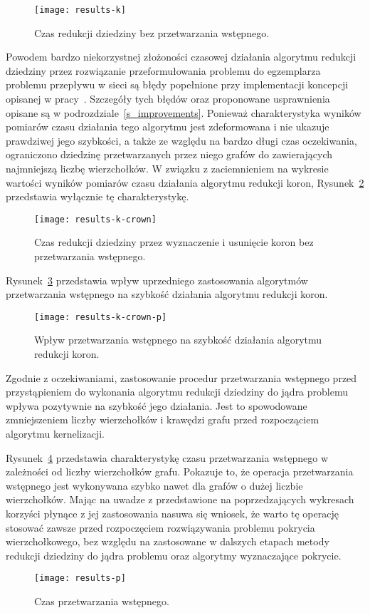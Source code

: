   \begin{figure}
    \caption{Czas redukcji dziedziny bez przetwarzania wstępnego.}
    \label{fig_results_k}
    \centering
      \texttt{[image: results-k]}
  \end{figure}

  Powodem bardzo niekorzystnej złożoności czasowej działania algorytmu redukcji dziedziny przez rozwiązanie przeformułowania problemu do egzemplarza problemu przepływu w sieci są błędy popełnione przy implementacji koncepcji opisanej w pracy~\cite{KernelizationAlgorithms04}.
  Szczegóły tych błędów oraz proponowane usprawnienia opisane są w podrozdziale~\ref{s_improvements}.
  Ponieważ charakterystyka wyników pomiarów czasu działania tego algorytmu jest zdeformowana i nie ukazuje prawdziwej jego szybkości, a także ze względu na bardzo długi czas oczekiwania, ograniczono dziedzinę przetwarzanych przez niego grafów do zawierających najmniejszą liczbę wierzchołków.
  W związku z zaciemnieniem na wykresie wartości wyników pomiarów czasu działania algorytmu redukcji koron, Rysunek~\ref{fig_results_k_crown} przedstawia wyłącznie tę charakterystykę.

  \begin{figure}
    \caption{Czas redukcji dziedziny przez wyznaczenie i usunięcie koron bez przetwarzania wstępnego.}
    \label{fig_results_k_crown}
    \centering
      \texttt{[image: results-k-crown]}
  \end{figure}

  Rysunek~\ref{fig_results_k_crown_p} przedstawia wpływ uprzedniego zastosowania algorytmów przetwarzania wstępnego na szybkość działania algorytmu redukcji koron.
  \begin{figure}
    \caption{Wpływ przetwarzania wstępnego na szybkość działania algorytmu redukcji koron.}
    \label{fig_results_k_crown_p}
    \centering
      \texttt{[image: results-k-crown-p]}
  \end{figure}

  Zgodnie z oczekiwaniami, zastosowanie procedur przetwarzania wstępnego przed przystąpieniem do wykonania algorytmu redukcji dziedziny do jądra problemu wpływa pozytywnie na szybkość jego działania.
  Jest to spowodowane zmniejszeniem liczby wierzchołków i krawędzi grafu przed rozpocząciem algorytmu kernelizacji.

  Rysunek~\ref{fig_results_p} przedstawia charakterystykę czasu przetwarzania wstępnego w zależności od liczby wierzchołków grafu.
  Pokazuje to, że operacja przetwarzania wstępnego jest wykonywana szybko nawet dla grafów o dużej liczbie wierzchołków. Mając na uwadze z przedstawione na poprzedzających wykresach korzyści płynące z jej zastosowania nasuwa się wniosek, że warto tę operację stosować zawsze przed rozpoczęciem rozwiązywania problemu pokrycia wierzchołkowego, bez względu na zastosowane w dalszych etapach metody redukcji dziedziny do jądra problemu oraz algorytmy wyznaczające pokrycie.
  \begin{figure}
    \caption{Czas przetwarzania wstępnego.}
    \label{fig_results_p}
    \centering
      \texttt{[image: results-p]}
  \end{figure}

  